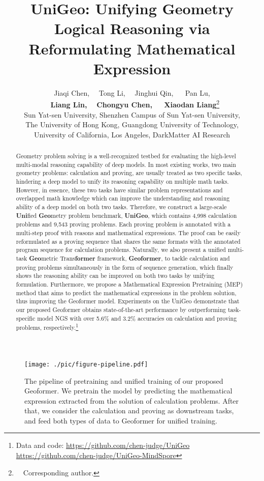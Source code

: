 \documentclass[11pt]{article}
\title{UniGeo: Unifying Geometry Logical Reasoning via  Reformulating Mathematical Expression}
\author{Jiaqi Chen,~~ Tong Li,~~ Jinghui Qin, ~~ Pan Lu, \\ 
~~ {\bf Liang Lin}{\bf ,} ~~{\bf Chongyu Chen}{\bf ,} ~~ {\bf Xiaodan Liang}\thanks{~~Corresponding author.}~\\
{Sun Yat-sen University, Shenzhen Campus of Sun Yat-sen University, } \\
{ The University of Hong Kong, Guangdong University of Technology, }\\ {University of California, Los Angeles, DarkMatter AI Research}\\
}
\begin{document}
\maketitle


\begin{abstract}
Geometry problem solving is a well-recognized testbed for evaluating the high-level multi-modal reasoning capability of deep models. In most existing works, two main geometry problems: calculation and proving, are usually treated as two specific tasks, hindering a deep model to unify its reasoning capability on multiple math tasks. However, in essence, these two tasks have similar problem representations and overlapped math knowledge which can improve the understanding and reasoning ability of a deep model on both two tasks.
Therefore, we construct a large-scale \textbf{Uni}fied \textbf{Geo}metry problem benchmark, \textbf{UniGeo}, which contains 4,998 calculation problems and 9,543 proving problems.
Each proving problem is annotated with a multi-step proof with reasons and mathematical expressions. The proof can be easily reformulated as a proving sequence that shares the same formats with the annotated program sequence for calculation problems.
Naturally, we also present a unified multi-task \textbf{Geo}metric Trans\textbf{former} framework, \textbf{Geoformer}, to tackle calculation and proving problems simultaneously in the form of sequence generation, which finally shows the reasoning ability can be improved on both two tasks by unifying formulation. Furthermore, we propose a Mathematical Expression Pretraining (MEP) method that aims to predict the mathematical expressions in the problem solution, thus improving the Geoformer model.
Experiments on the UniGeo demonstrate that our proposed Geoformer obtains state-of-the-art performance by outperforming task-specific model NGS with over 5.6\% and 3.2\% accuracies on calculation and proving problems, respectively.\footnote{Data and code: \href{https://github.com/chen-judge/UniGeo}{https://github.com/chen-judge/UniGeo} \href{https://github.com/chen-judge/UniGeo-MindSpore}{https://github.com/chen-judge/UniGeo-MindSpore}}


\end{abstract}

\begin{figure}[t]
\begin{center}
 \texttt{[image: ./pic/figure-pipeline.pdf]}
 \vspace{-8mm}
\end{center}
  \caption{
  The pipeline of pretraining and unified training of our proposed Geoformer. We pretrain the model by predicting the mathematical expression extracted from the solution of calculation problems. After that, we consider the calculation and proving as downstream tasks, and feed both types of data to Geoformer for unified training. 
  }
\vspace{-2mm}
\label{fig:pipeline}
\end{figure}
\end{document}

